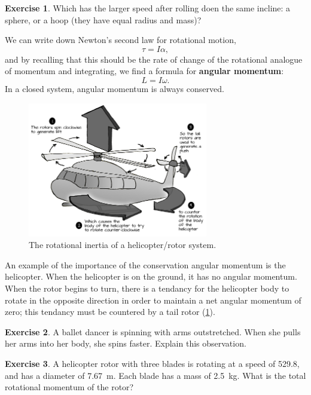 \documentclass[a4paper]{amsbook}
\theoremstyle{definition}
\newtheorem{exercise}{Exercise}
\numberwithin{exercise}{chapter}
\numberwithin{exercise}{chapter}
\begin{document}
\begin{exercise}
  Which has the larger speed after rolling doen the same incline: a sphere, or a hoop (they have equal radius and mass)?
\end{exercise}

We can write down Newton's second law for rotational motion,
\begin{equation}
  \tau = I \alpha,
\end{equation}
and by recalling that this should be the rate of change of the rotational analogue of momentum and integrating,
we find a formula for \textbf{angular momentum}:
\begin{equation}
  L = I\omega.
\end{equation}
In a closed system, angular momentum is always conserved.

\begin{figure}
  \centering
  \includegraphics[width=0.7\textwidth]{helicopter}
  \caption{The rotational inertia of a helicopter/rotor system.\label{fig:helicopter}}
\end{figure}

An example of the importance of the conservation angular momentum is the helicopter. When the helicopter is on the ground, it has no angular
momentum. When the rotor begins to turn, there is a tendancy for the helicopter body to rotate in the opposite direction in order to maintain
a net angular momentum of zero; this tendancy must be countered by a tail rotor (\cref{fig:helicopter}).

\begin{exercise}
  A ballet dancer is spinning with arms outstretched. When she pulls her arms into her body, she spins faster.
  Explain this observation.
\end{exercise}

\begin{exercise}
  A helicopter rotor with three blades is rotating at a speed of \SI{529.8}{\rpm}, and has a diameter
  of \SI{7.67}{\metre}. Each blade has a mass of \SI{2.5}{\kilo\gram}. What is the total rotational momentum of the rotor?
\end{exercise}
\end{document}
